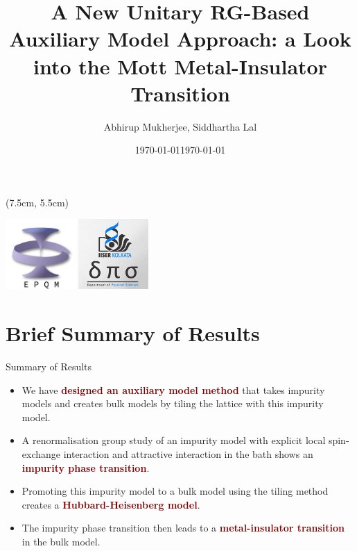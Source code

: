 \documentclass[aspectratio=169]{beamer}
\title{
{\LARGE A New Unitary RG-Based Auxiliary Model Approach: a Look into the Mott Metal-Insulator Transition
}
}
\date{\today}
\author{\large Abhirup Mukherjee, Siddhartha Lal}
\institute{Department of Physical Sciences, IISER Kolkata, Mohanpur}
\date{\large\today}
\newcommand{\focus}[1]{\textcolor{maroon}{\textbf{#1}}}
\begin{document}
\begin{frame}[noframenumbering]
\maketitle
\begin{textblock*}{0.7\textwidth}(7.5cm, 5.5cm)
	\centering
	\vspace*{\fill}

	\hspace*{\fill}
	\includegraphics[width=0.2\textwidth]{figures/epqm_logo_mod.jpeg}
	\includegraphics[width=0.2\textwidth]{figures/dps_logo.jpeg}
	\hspace*{\fill}

	\vspace*{\fill}
\end{textblock*}
\end{frame}

\section{Brief Summary of Results}
\begin{frame}[noframenumbering]{Summary of Results}
\begin{itemize}[<+->]
	\item We have \focus{designed an auxiliary model method} that takes impurity models and creates bulk models by tiling the lattice with this impurity model.
	\item A renormalisation group study of an impurity model with explicit local spin-exchange interaction and attractive interaction in the bath shows an \focus{impurity phase transition}.
	\item Promoting this impurity model to a bulk model using the tiling method creates a \focus{Hubbard-Heisenberg model}.
	\item The impurity phase transition then leads to a \focus{metal-insulator transition} in the bulk model.
\end{itemize}
\end{frame}
\end{document}
